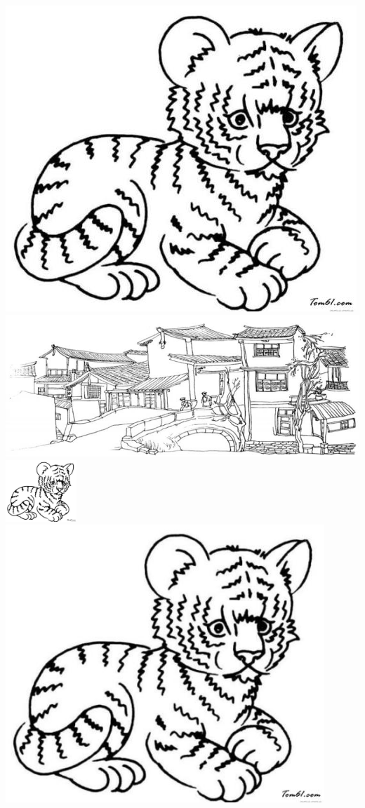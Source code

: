 \documentclass{ctexart}%
\begin{document}
	\includegraphics[height=0.6\textheight]{lion}\\%
	\includegraphics[height=0.6\textheight]{mountain}\\
	
	\includegraphics[width=0.2\textwidth]{lion}\\%
	
	\includegraphics[angle=45,width=0.9\textwidth]{lion}%
\end{document}
